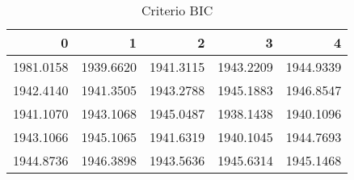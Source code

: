 \begin{table}[H]
\label{tab:autoarima_bic}
\centering
\begin{tabular}{rrrrr}
\toprule
0 & 1 & 2 & 3 & 4 \\
\midrule
1981.0158 & 1939.6620 & 1941.3115 & 1943.2209 & 1944.9339 \\
1942.4140 & 1941.3505 & 1943.2788 & 1945.1883 & 1946.8547 \\
1941.1070 & 1943.1068 & 1945.0487 & 1938.1438 & 1940.1096 \\
1943.1066 & 1945.1065 & 1941.6319 & 1940.1045 & 1944.7693 \\
1944.8736 & 1946.3898 & 1943.5636 & 1945.6314 & 1945.1468 \\
\bottomrule
\end{tabular}
\caption{Criterio BIC}
\end{table}
